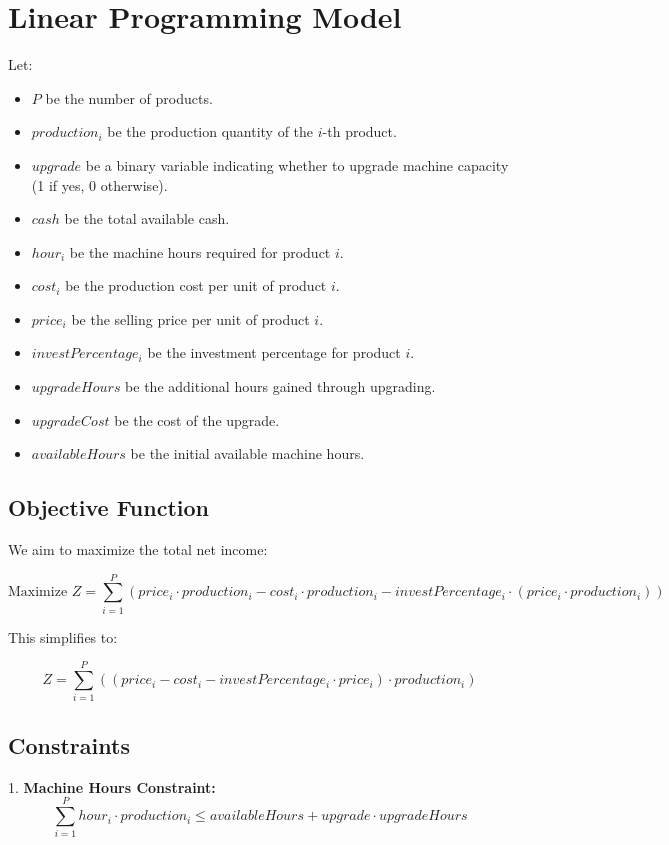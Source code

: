 \documentclass{article}
\begin{document}
\section*{Linear Programming Model}

Let:
\begin{itemize}
    \item \( P \) be the number of products.
    \item \( production_i \) be the production quantity of the \( i \)-th product.
    \item \( upgrade \) be a binary variable indicating whether to upgrade machine capacity (1 if yes, 0 otherwise).
    \item \( cash \) be the total available cash.
    \item \( hour_i \) be the machine hours required for product \( i \).
    \item \( cost_i \) be the production cost per unit of product \( i \).
    \item \( price_i \) be the selling price per unit of product \( i \).
    \item \( investPercentage_i \) be the investment percentage for product \( i \).
    \item \( upgradeHours \) be the additional hours gained through upgrading.
    \item \( upgradeCost \) be the cost of the upgrade.
    \item \( availableHours \) be the initial available machine hours.
\end{itemize}

\subsection*{Objective Function}

We aim to maximize the total net income:

\[
\text{Maximize } Z = \sum_{i=1}^{P} (price_i \cdot production_i - cost_i \cdot production_i - investPercentage_i \cdot (price_i \cdot production_i)) 
\]

This simplifies to:

\[
Z = \sum_{i=1}^{P} \left( (price_i - cost_i - investPercentage_i \cdot price_i) \cdot production_i \right)
\]

\subsection*{Constraints}

1. \textbf{Machine Hours Constraint:}
\[
\sum_{i=1}^{P} hour_i \cdot production_i \leq availableHours + upgrade \cdot upgradeHours
\]
\end{document}
